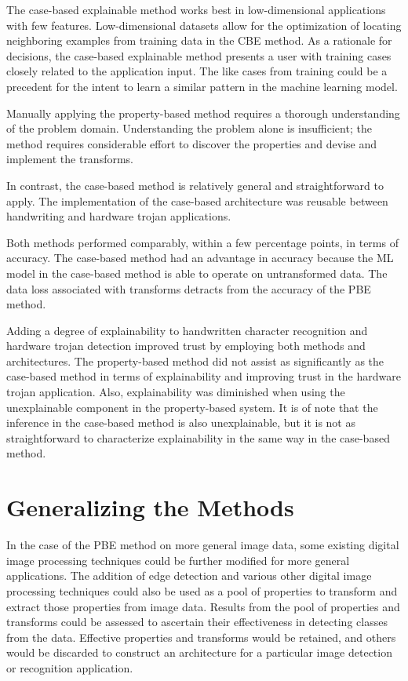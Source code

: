 The case-based explainable method works best in low-dimensional applications
with few features. Low-dimensional datasets allow for the optimization of
locating neighboring examples from training data in the CBE method. As a
rationale for decisions, the case-based explainable method presents a user with
training cases closely related to the application input. The like cases from
training could be a precedent for the intent to learn a similar pattern in the
machine learning model.

Manually applying the property-based method requires a thorough understanding of
the problem domain. Understanding the problem alone is insufficient; the method
requires considerable effort to discover the properties and devise and implement
the transforms.

In contrast, the case-based method is relatively general and straightforward to
apply. The implementation of the case-based architecture was reusable between
handwriting and hardware trojan applications.

Both methods performed comparably, within a few percentage points, in terms of
accuracy. The case-based method had an advantage in accuracy because the ML
model in the case-based method is able to operate on untransformed data. The
data loss associated with transforms detracts from the accuracy of the PBE
method.

Adding a degree of explainability to handwritten character recognition and
hardware trojan detection improved trust by employing both methods and
architectures. The property-based method did not assist as significantly as the
case-based method in terms of explainability and improving trust in the hardware
trojan application. Also, explainability was diminished when using the
unexplainable component in the property-based system. It is of note that the
inference in the case-based method is also unexplainable, but it is not as
straightforward to characterize explainability in the same way in the case-based
method.

\section{Generalizing the Methods}

In the case of the PBE method on more general image data, some existing digital
image processing techniques could be further modified for more general
applications. The addition of edge detection and various other digital image
processing techniques could also be used as a pool of properties to transform
and extract those properties from image data. Results from the pool of
properties and transforms could be assessed to ascertain their effectiveness in
detecting classes from the data. Effective properties and transforms would be
retained, and others would be discarded to construct an architecture for a
particular image detection or recognition application.

